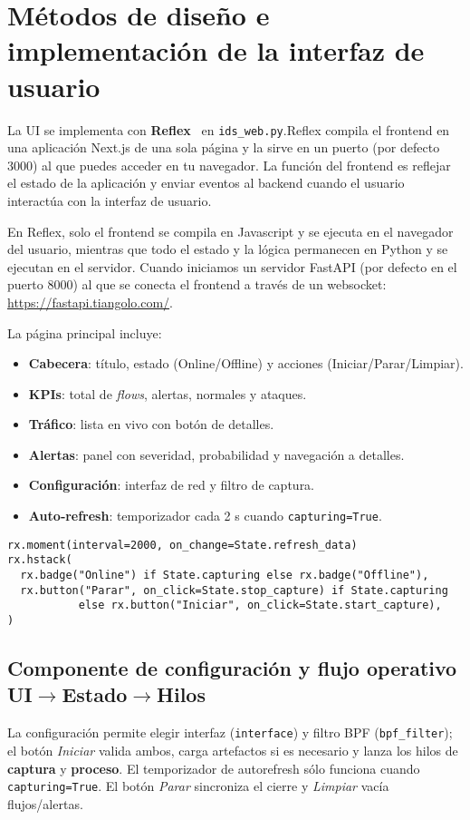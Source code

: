 \section{Métodos de diseño e implementación de la interfaz de usuario}
La UI se implementa con \textbf{Reflex}~\cite{rootstackReflex} en \texttt{ids\_web.py}.Reflex compila el frontend en una aplicación Next.js de una sola página y la sirve en un puerto (por defecto 3000) al que puedes acceder en tu navegador. La función del frontend es reflejar el estado de la aplicación y enviar eventos al backend cuando el usuario interactúa con la interfaz de usuario.

En Reflex, solo el frontend se compila en Javascript y se ejecuta en el navegador del usuario, mientras que todo el estado y la lógica permanecen en Python y se ejecutan en el servidor. Cuando iniciamos un servidor FastAPI (por defecto en el puerto 8000) al que se conecta el frontend a través de un websocket: \url{https://fastapi.tiangolo.com/}.

La página principal incluye:
\begin{itemize}
  \item \textbf{Cabecera}: título, estado (Online/Offline) y acciones (Iniciar/Parar/Limpiar).
  \item \textbf{KPIs}: total de \textit{flows}, alertas, normales y ataques.
  \item \textbf{Tráfico}: lista en vivo con botón de detalles.
  \item \textbf{Alertas}: panel con severidad, probabilidad y navegación a detalles.
  \item \textbf{Configuración}: interfaz de red y filtro de captura.
  \item \textbf{Auto‑refresh}: temporizador cada 2 s cuando \texttt{capturing=True}.
\end{itemize}

\begin{lstlisting}[style=tfgpython,caption={Auto‑refresh y cabecera },label=List.ReflexHeader]
rx.moment(interval=2000, on_change=State.refresh_data)
rx.hstack(
  rx.badge("Online") if State.capturing else rx.badge("Offline"),
  rx.button("Parar", on_click=State.stop_capture) if State.capturing
           else rx.button("Iniciar", on_click=State.start_capture),
)
\end{lstlisting}

\subsection*{Componente de configuración y flujo operativo UI$\rightarrow$Estado$\rightarrow$Hilos}
La configuración permite elegir interfaz (\texttt{interface}) y filtro BPF (\texttt{bpf\_filter}); el botón \textit{Iniciar} valida ambos, carga artefactos si es necesario y lanza los hilos de \textbf{captura} y \textbf{proceso}. El temporizador de auto\-refresh sólo funciona cuando \texttt{capturing=True}. El botón \textit{Parar} sincroniza el cierre y \textit{Limpiar} vacía flujos/alertas.

